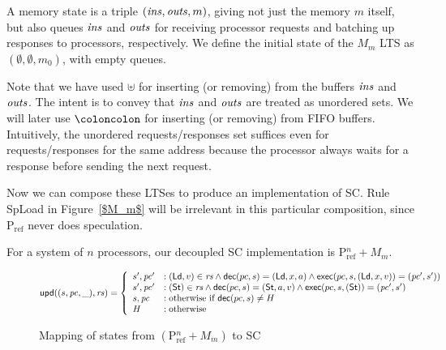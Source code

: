A memory state is a triple $(\mathit{ins}, \mathit{outs}, m)$, giving not just the
memory $m$ itself, but also queues $\mathit{ins}$ and $\mathit{outs}$ for receiving
processor requests and batching up responses to processors,
respectively.  We define the initial state of the $M_m$ LTS as
$(\emptyset, \emptyset, m_0)$, with empty queues.

Note that we have used $\uplus$ for inserting (or removing) from the buffers
$\mathit{ins}$ and $\mathit{outs}$. The intent is to convey that $\mathit{ins}$ and $\mathit{outs}$ are treated
as unordered sets. We will later use $\coloncolon$ for inserting (or removing)
from FIFO buffers. Intuitively, the unordered requests/responses set suffices
even for requests/responses for the same address because the processor always
waits for a response before sending the next request.

Now we can compose these LTSes to produce an implementation of SC.  Rule SpLoad
in Figure~\ref{$M_m$} will be irrelevant in this particular composition, since
P$_{\text{ref}}$ never does speculation.

For a system of $n$ processors, our decoupled SC implementation is
$\text{P$^n_{\text{ref}}$} + M_m$.

\begin{figure*}[t]
\begin{displaymath}
\mathsf{upd}((s, \mathit{pc}, \_), \mathit{rs}) =
\left\{
\begin{array}{ll}
s', \mathit{pc}' &: (\mathsf{Ld}, v) \in \mathit{rs} \wedge \mathsf{dec}(pc, s) = (\mathsf{Ld}, x, a) \wedge
\mathsf{exec}(pc, s, (\mathsf{Ld}, x, v)) = (\mathit{pc}', s'))\\
s', \mathit{pc}' &: (\mathsf{St}) \in \mathit{rs} \wedge \mathsf{dec}(pc, s) = (\mathsf{St}, a, v) \wedge
\mathsf{exec}(pc, s, (\mathsf{St})) = (\mathit{pc}', s')\\
s, \mathit{pc} &: \text{otherwise if } \mathsf{dec}(pc,s) \neq H\\
H &: \text{otherwise}
\end{array}
\right.
\end{displaymath}
\caption{Mapping of states from $(\text{P$^n_\text{ref}$} + M_m)$ to SC}
\label{smap}
\end{figure*}

